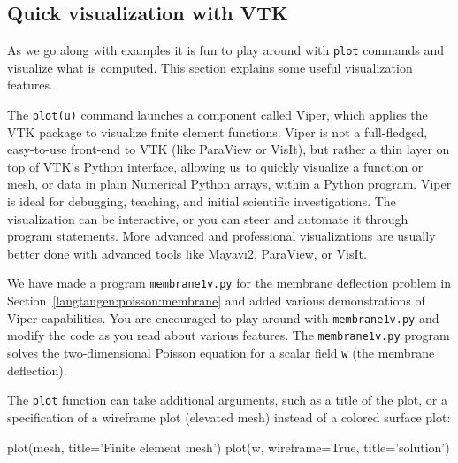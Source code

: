 \subsection{Quick visualization with VTK}
\label{langtangen:quickviz}

As we go along with examples it is fun to play around with
{\fontsize{10pt}{10pt}\texttt{plot}} commands and visualize what is computed. This section explains
some useful visualization features.

The {\fontsize{10pt}{10pt}\verb!plot(u)!} command launches a \fenics{} component called Viper, which
applies the VTK package to visualize finite element functions.
Viper is not a full-fledged, easy-to-use front-end to VTK (like ParaView
or VisIt), but rather a thin layer on top of VTK's Python interface,
allowing us to quickly visualize a \dolfin{} function or mesh, or data in
plain Numerical Python arrays, within a Python program. 
Viper is ideal for debugging, teaching, and initial scientific investigations.
The visualization can be interactive, or you can steer and automate it
through program statements.
More advanced and professional visualizations are usually better done with
advanced tools like Mayavi2, ParaView, or VisIt.

We have made a program {\fontsize{10pt}{10pt}\texttt{membrane1v.py}} for the membrane deflection
problem in Section~\ref{langtangen:poisson:membrane} and added various
demonstrations of Viper capabilities. You are encouraged to play around with
{\fontsize{10pt}{10pt}\texttt{membrane1v.py}} and modify the code as you read about various features.
The {\fontsize{10pt}{10pt}\texttt{membrane1v.py}} program solves the two-dimensional Poisson
equation for a scalar field {\fontsize{10pt}{10pt}\texttt{w}} (the membrane deflection).

The {\fontsize{10pt}{10pt}\texttt{plot}} function can take additional arguments, such as
a title of the plot, or a specification of a wireframe plot (elevated mesh)
instead of a colored surface plot:
\begin{python}
plot(mesh, title='Finite element mesh')
plot(w, wireframe=True, title='solution')
\end{python}

